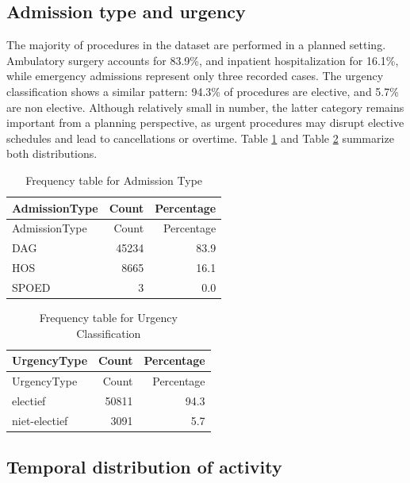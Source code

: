 \documentclass[
]{article}
\begin{document}
\subsection{Admission type and
urgency}\label{admission-type-and-urgency}

The majority of procedures in the dataset are performed in a planned
setting. Ambulatory surgery accounts for 83.9\%, and inpatient
hospitalization for 16.1\%, while emergency admissions represent only
three recorded cases. The urgency classification shows a similar
pattern: 94.3\% of procedures are elective, and 5.7\% are non elective.
Although relatively small in number, the latter category remains
important from a planning perspective, as urgent procedures may disrupt
elective schedules and lead to cancellations or overtime. Table
\ref{tab:admissiontype} and Table \ref{tab:urgencytype} summarize both
distributions.

\begin{longtable}[]{@{}lrr@{}}
\caption{Frequency table for Admission Type
\label{tab:admissiontype}}\tabularnewline
\toprule\noalign{}
AdmissionType & Count & Percentage \\
\midrule\noalign{}
\endfirsthead
\toprule\noalign{}
AdmissionType & Count & Percentage \\
\midrule\noalign{}
\endhead
\bottomrule\noalign{}
\endlastfoot
DAG & 45234 & 83.9 \\
HOS & 8665 & 16.1 \\
SPOED & 3 & 0.0 \\
\end{longtable}

\begin{longtable}[]{@{}lrr@{}}
\caption{Frequency table for Urgency Classification
\label{tab:urgencytype}}\tabularnewline
\toprule\noalign{}
UrgencyType & Count & Percentage \\
\midrule\noalign{}
\endfirsthead
\toprule\noalign{}
UrgencyType & Count & Percentage \\
\midrule\noalign{}
\endhead
\bottomrule\noalign{}
\endlastfoot
electief & 50811 & 94.3 \\
niet-electief & 3091 & 5.7 \\
\end{longtable}

\subsection{Temporal distribution of
activity}\label{temporal-distribution-of-activity}
\end{document}
